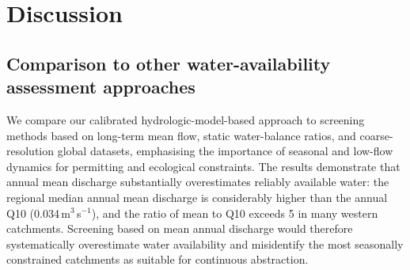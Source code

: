 \documentclass[draft]{agujournal2019}
\begin{document}

\section{Discussion}

\subsection{Comparison to other water-availability assessment approaches}
We compare our calibrated hydrologic-model-based approach to screening methods based on long-term mean flow, static water-balance ratios, and coarse-resolution global datasets, emphasising the importance of seasonal and low-flow dynamics for permitting and ecological constraints. The results demonstrate that annual mean discharge substantially overestimates reliably available water: the regional median annual mean discharge is considerably higher than the annual Q10 (0.034\,m$^3$\,s$^{-1}$), and the ratio of mean to Q10 exceeds 5 in many western catchments. Screening based on mean annual discharge would therefore systematically overestimate water availability and misidentify the most seasonally constrained catchments as suitable for continuous abstraction.
\end{document}
